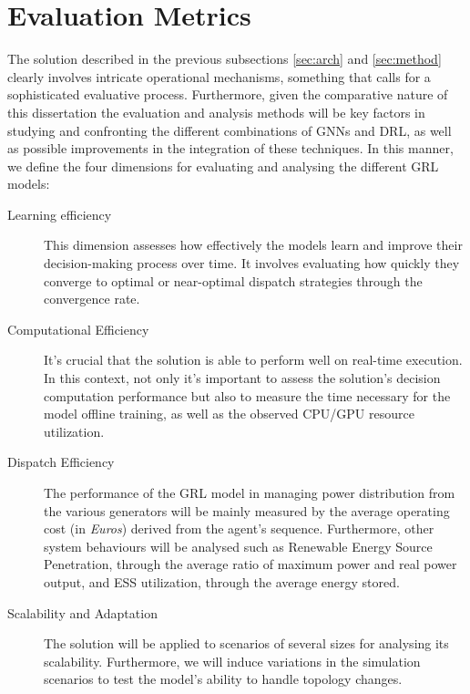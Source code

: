 \section{Evaluation Metrics} \label{sec:eval-methods}

The solution described in the previous subsections \ref{sec:arch} and \ref{sec:method} clearly involves intricate operational mechanisms, something that calls for a sophisticated evaluative process. Furthermore, given the comparative nature of this dissertation the evaluation and analysis methods will be key factors in studying and confronting the different combinations of \acp{GNN} and \ac{DRL}, as well as possible improvements in the integration of these techniques.
In this manner, we define the four dimensions for evaluating and analysing the different \ac{GRL} models:

\begin{description}
	\item[Learning efficiency] This dimension assesses how effectively the models learn and improve their decision-making process over time. It involves evaluating how quickly they converge to optimal or near-optimal dispatch strategies through the convergence rate. 
	
	\item[Computational Efficiency] It's crucial that the solution is able to perform well on real-time execution. In this context, not only it's important to assess the solution's decision computation performance but also to measure the time necessary for the model offline training, as well as the observed CPU/GPU resource utilization.
	
	\item[Dispatch Efficiency] The performance of the \ac{GRL} model in managing power distribution from the various generators will be mainly measured by the average operating cost (in \textit{Euros}) derived from the agent's sequence. Furthermore, other system behaviours will be analysed such as Renewable Energy Source Penetration, through the average ratio of maximum power and real power output, and \ac{ESS} utilization, through the average energy stored.
	
	\item[Scalability and Adaptation]  The solution will be applied to scenarios of several sizes for analysing its scalability. Furthermore, we will induce variations in the simulation scenarios to test the model's ability to handle topology changes.
\end{description}


